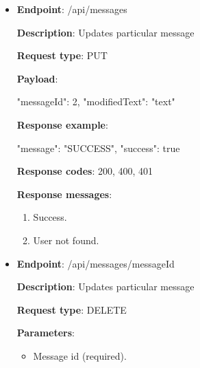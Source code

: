 \begin{itemize}
    \textbf{Response codes}: 200, 400, 401

    \textbf{Response messages}:
    \begin{enumerate}
        \item Success.
        \item User not found.
    \end{enumerate}

    \pagebreak

    \item \textbf{Endpoint}: /api/messages

    \textbf{Description}: Updates particular message

    \textbf{Request type}: PUT

    \textbf{Payload}:

    \begin{spverbatim}
    {
        "messageId": 2,
        "modifiedText": "text"
    }
    \end{spverbatim}

    \textbf{Response example}:

    \begin{spverbatim}
    {
        "message": "SUCCESS",
        "success": true
    }
    \end{spverbatim}

    \textbf{Response codes}: 200, 400, 401

    \textbf{Response messages}:
    \begin{enumerate}
        \item Success.
        \item User not found.
    \end{enumerate}

    \vspace{5mm}
    
    \item \textbf{Endpoint}: /api/messages/{messageId}

    \textbf{Description}: Updates particular message

    \textbf{Request type}: DELETE

    \textbf{Parameters}:

    \begin{itemize}
        \item Message id (required).
    \end{itemize}


\end{itemize}
